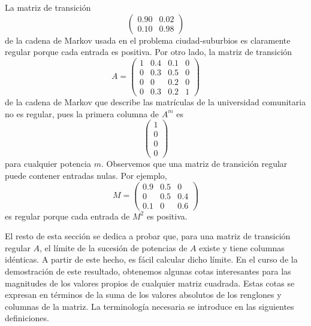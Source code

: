 \documentclass[12pt,a4paper]{book}
\begin{document}
    \begin{ejemplo}
        La matriz de transición
        \begin{equation*}
            \begin{pmatrix}0.90&0.02\\0.10&0.98\end{pmatrix}
        \end{equation*}
        de la cadena de Markov usada en el problema ciudad-suburbios es claramente regular porque cada entrada es positiva. Por otro lado, la matriz de transición
        \begin{equation*}
            A=\begin{pmatrix}1&0.4&0.1&0\\0&0.3&0.5&0\\0&0&0.2&0\\0&0.3&0.2&1\end{pmatrix}
        \end{equation*}
        de la cadena de Markov que describe las matrículas de la universidad comunitaria no es regular, pues la primera columna de $A^m$ es
        \begin{equation*}
            \begin{pmatrix}1\\0\\0\\0\end{pmatrix}
        \end{equation*}
        para cualquier potencia $m$. Observemos que una matriz de transición regular puede contener entradas nulas. Por ejemplo,
        \begin{equation*}
            M=\begin{pmatrix}0.9&0.5&0\\0&0.5&0.4\\0.1&0&0.6\end{pmatrix}
        \end{equation*}
        es regular porque cada entrada de $M^2$ es positiva.
    \end{ejemplo}

    El resto de esta sección se dedica a probar que, para una matriz de transición regular $A$, el límite de la sucesión de potencias de $A$ existe y tiene columnas idénticas. A partir de este hecho, es fácil calcular dicho límite. En el curso de la demostración de este resultado, obtenemos algunas cotas interesantes para las magnitudes de los valores propios de cualquier matriz cuadrada. Estas cotas se expresan en términos de la suma de los valores absolutos de los renglones y columnas de la matriz. La terminología necesaria se introduce en las siguientes definiciones.
\end{document}
